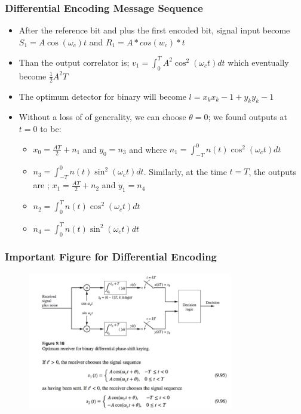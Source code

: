 \documentclass{beamer}
\begin{document}
\begin{frame}
	\frametitle{Differential Encoding Message Sequence}
	\begin{itemize}
		\item After the reference bit and plus the first encoded bit, signal input become $S_1=A \cos(\omega_c) t$ and $R_1=A*cos(w_c)*t$
		\item Than the output correlator is; $v_1= \int_{0}^{T} A^2 \cos^2(\omega_c t) dt$ which eventually become $\frac{1}{2} A^2 T$
		\item The optimum detector for binary will become  $l= x_k x_k-1 +y_k y_k-1$
		\item Without a loss of of generality, we can choose $\theta=0$; we found outputs at $t=0$ to be:
			\begin{itemize}
			\item $x_0= \frac{A T}{2}+n_1$ and $y_0=n_3$ and where $n_1=  \int_{-T}^{0} n(t) \cos^2(\omega_c t) dt$
			\item  $n_3=\int_{-T}^{0} n(t) \sin^2(\omega_c t) dt$. Similarly, at the time $t=T$, the outputs are ;
			$x_1=\frac{AT}{2}+n_2$ and $y_1=n_4$
			\item $n_2=\int_{0}^{T} n(t) \cos^2(\omega_c t) dt$
			\item $n_4=\int_{0}^{T} n(t) \sin^2(\omega_c t) dt$
			\end{itemize}
	\end{itemize}
\end{frame}

\begin{frame}
	\frametitle{Important Figure for Differential Encoding }
	\begin{figure}
		\includegraphics[width=0.8\textwidth]{9_4_2.png}
	\end{figure}
\end{frame}
\end{document}
